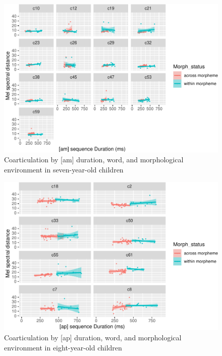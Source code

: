 \documentclass[
]{article}
\begin{document}
\begin{figure}
\centering
\includegraphics{3_ch3_results_files/figure-latex/seven-facet-am-1.pdf}
\caption{\label{fig:seven-facet-am}Coarticulation by {[}am{]} duration, word, and morphological environment in seven-year-old children}
\end{figure}

\begin{figure}
\centering
\includegraphics{3_ch3_results_files/figure-latex/eight-facet-ap-1.pdf}
\caption{\label{fig:eight-facet-ap}Coarticulation by {[}ap{]} duration, word, and morphological environment in eight-year-old children}
\end{figure}
\end{document}
